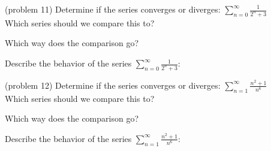 \documentclass[handout]{ximera}
\begin{document}
\begin{problem}(problem 11)
Determine if the series converges or diverges: $\displaystyle{\sum_{n=0}^\infty \frac{1}{2^n + 3}}$\\
Which series should we compare this to?

\begin{multipleChoice}
\end{multipleChoice}

Which way does the comparison go?
\begin{multipleChoice}
\end{multipleChoice}

Describe the behavior of the series $\sum_{n=0}^\infty \frac{1}{2^n + 3}:$
\begin{multipleChoice}
\end{multipleChoice}

\end{problem}





\begin{problem}(problem 12)
Determine if the series converges or diverges: $\displaystyle{\sum_{n=1}^\infty \frac{n^2 +1}{n^6}}$\\
Which series should we compare this to?

\begin{multipleChoice}
\end{multipleChoice}

Which way does the comparison go?
\begin{multipleChoice}
\end{multipleChoice}

Describe the behavior of the series $\sum_{n=1}^\infty \frac{n^2+1}{n^6}:$
\begin{multipleChoice}
\end{multipleChoice}

\end{problem}
\end{document}
